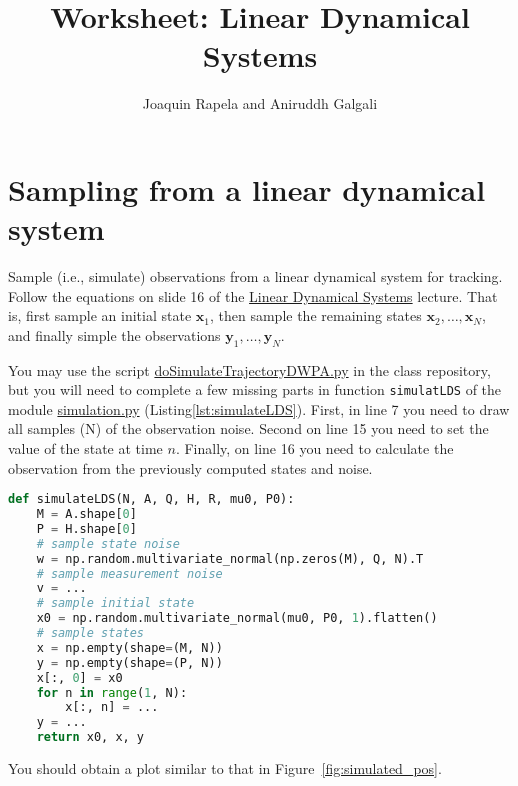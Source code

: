 \documentclass[12pt]{article}
\title{Worksheet: Linear Dynamical Systems}
\author{Joaquin Rapela and Aniruddh Galgali}
\begin{document}
\maketitle

\section{Sampling from a linear dynamical system}

Sample (i.e., simulate) observations from a linear dynamical system for
tracking.  Follow the equations on slide 16 of the
\href{https://github.com/joacorapela/neuroinformatics24/blob/master/lectures/07_linearDynamicalSystems/LDS_SWCNeuroinf2024.pdf}{Linear
Dynamical Systems} lecture. That is, first sample an initial state
$\mathbf{x}_1$, then sample the remaining states
$\mathbf{x}_2,\ldots,\mathbf{x}_N$, and finally simple the observations
$\mathbf{y}_1,\ldots,\mathbf{y}_N$.

You may use the script
\href{https://github.com/joacorapela/neuroinformatics24/blob/master/worksheets/07_linearDynamicalSystems/code/scripts/doSimulateTrajectoryDWPA.py}{doSimulateTrajectoryDWPA.py}
in the class repository, but you will need to complete a few missing parts in
function \texttt{simulatLDS} of
the module
\href{https://github.com/joacorapela/neuroinformatics24/blob/master/worksheets/07_linearDynamicalSystems/code/src/simulation.py}{simulation.py} (Listing\ref{lst:simulateLDS}). First, in line 7 you need to draw all samples (N) of the observation noise. Second on line 15 you need to set the value of the state at time $n$. Finally, on line 16 you need to calculate the observation from the previously computed states and noise.

\begin{lstlisting}[caption={function \texttt{simulateLDS} in module \texttt{simulation.py}},label={lst:simulateLDS},language=python]
def simulateLDS(N, A, Q, H, R, mu0, P0):
    M = A.shape[0]
    P = H.shape[0]
    # sample state noise
    w = np.random.multivariate_normal(np.zeros(M), Q, N).T
    # sample measurement noise
    v = ...
    # sample initial state
    x0 = np.random.multivariate_normal(mu0, P0, 1).flatten()
    # sample states
    x = np.empty(shape=(M, N))
    y = np.empty(shape=(P, N))
    x[:, 0] = x0
    for n in range(1, N):
        x[:, n] = ...
    y = ...
    return x0, x, y
\end{lstlisting}

You should obtain a plot similar to that in Figure~\ref{fig:simulated_pos}.
\end{document}
